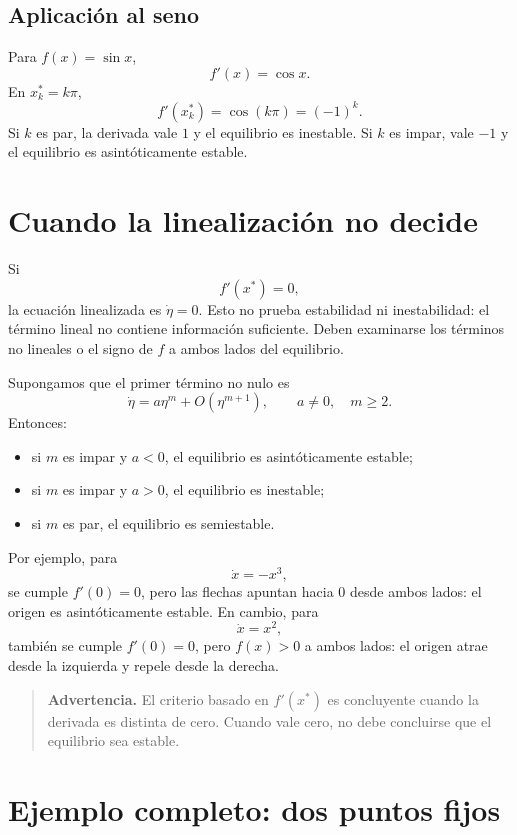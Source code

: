 \documentclass[12pt,a4paper]{article}
\begin{document}
	\subsection{Aplicación al seno}

	Para \(f(x)=\sin x\),
	\[
	f'(x)=\cos x.
	\]
En \(x_k^\ast=k\pi\),
	\[
	f'(x_k^\ast)=\cos(k\pi)=(-1)^k.
	\]
Si \(k\) es par, la derivada vale \(1\) y el equilibrio es inestable. Si \(k\) es impar, vale \(-1\) y el equilibrio es asintóticamente estable.

	\clearpage
	\section{Cuando la linealización no decide}

	Si
	\[
	f'(x^\ast)=0,
	\]
la ecuación linealizada es \(\dot{\eta}=0\). Esto no prueba estabilidad ni inestabilidad: el término lineal no contiene información suficiente. Deben examinarse los términos no lineales o el signo de \(f\) a ambos lados del equilibrio.

	Supongamos que el primer término no nulo es
	\[
	\dot{\eta}=a\eta^m+O(\eta^{m+1}),
	\qquad a\neq0,\quad m\geq2.
	\]
Entonces:
	\begin{itemize}[leftmargin=*]
		\item si \(m\) es impar y \(a<0\), el equilibrio es asintóticamente estable;
		\item si \(m\) es impar y \(a>0\), el equilibrio es inestable;
		\item si \(m\) es par, el equilibrio es semiestable.
	\end{itemize}

	Por ejemplo, para
	\[
	\dot{x}=-x^3,
	\]
se cumple \(f'(0)=0\), pero las flechas apuntan hacia \(0\) desde ambos lados: el origen es asintóticamente estable. En cambio, para
	\[
	\dot{x}=x^2,
	\]
también se cumple \(f'(0)=0\), pero \(f(x)>0\) a ambos lados: el origen atrae desde la izquierda y repele desde la derecha.

	\begin{quote}
		\textbf{Advertencia.} El criterio basado en \(f'(x^\ast)\) es concluyente cuando la derivada es distinta de cero. Cuando vale cero, no debe concluirse que el equilibrio sea estable.
	\end{quote}

	\clearpage
	\section{Ejemplo completo: dos puntos fijos}
\end{document}
